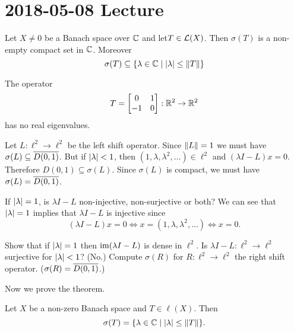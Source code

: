 \section{2018-05-08 Lecture}

\begin{thm}
  Let $X \neq 0$ be a Banach space over $\mathbb{C}$ and let$T \in \mathcal{L}(X)$.
  Then $\sigma(T)$ is a non-empty compact set in $\mathbb{C}$.
  Moreover
  \[ \sigma(T) \subseteq \{ \lambda \in \mathbb{C} \mid \left\lvert \lambda \right\rvert \leq \left\lVert T \right\rVert \} \]
\end{thm}

\begin{rmk}
  The operator
  \begin{equation*}
    T=
    \begin{bmatrix}
      0 & 1 \\
      -1 & 0
    \end{bmatrix}
    : \mathbb{R}^2 \to \mathbb{R}^2
  \end{equation*}
  has no real eigenvalues.
\end{rmk}

\begin{exam}
  Let $L: \ell^2 \to \ell^2$ be the left shift operator.
  Since $\left\lVert L \right\rVert = 1$ we must have $\sigma(L) \subseteq \overline{D(0,1)}$.
  But if $\left\lvert \lambda \right\rvert<1$, then $(1,\lambda,\lambda^2,\ldots) \in \ell^2$ and $(\lambda I-L)x=0$.
  Therefore $D(0,1) \subseteq \sigma(L)$.
  Since $\sigma(L)$ is compact, we must have $\sigma(L)=\overline{D(0,1)}$.

  If $\left\lvert \lambda \right\rvert=1$, is $\lambda I-L$ non-injective, non-surjective or both?
  We can see that $\left\lvert \lambda \right\rvert=1$ implies that $\lambda I-L$ is injective since
  \[ (\lambda I-L)x=0 \iff x=(1,\lambda,\lambda^2,\ldots) \iff x=0 .\]
\end{exam}

\begin{exer}
  \leavevmode
  \begin{enum}
    \io Show that if $\left\lvert \lambda \right\rvert=1$ then $\operatorname{im}(\lambda I-L)$ is dense in $\ell^2$.
    \io Is $\lambda I-L: \ell^2 \to \ell^2$ surjective for $\left\lvert \lambda \right\rvert<1$? (No.)
    \io Compute $\sigma(R)$ for $R: \ell^2 \to \ell^2$ the right shift operator. ($\sigma(R)=\overline{D(0,1)}$.)
  \end{enum}
\end{exer}

Now we prove the theorem.

\begin{prop}
  Let $X$ be a non-zero Banach space and $T \in \ell(X)$.
  Then
  \[ \sigma(T) = \{ \lambda \in \mathbb{C} \mid \left\lvert \lambda \right\rvert \leq \left\lVert T \right\rVert \}. \]
\end{prop}

